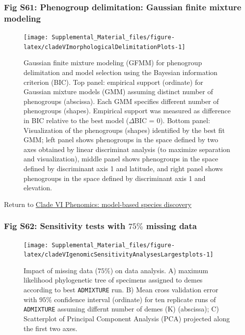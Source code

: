 \documentclass[
  11pt,
]{article}
\begin{document}
\hypertarget{fig-s61-phenogroup-delimitation-gaussian-finite-mixture-modeling}{%
\subsubsection{Fig S61: Phenogroup delimitation: Gaussian finite mixture modeling}\label{fig-s61-phenogroup-delimitation-gaussian-finite-mixture-modeling}}

\begin{figure}
\texttt{[image: Supplemental\_Material\_files/figure-latex/cladeVImorphologicalDelimitationPlots-1]} \caption{Gaussian finite mixture modeling (GFMM) for phenogroup delimitation and model selection using the Bayesian information criterion (BIC). Top panel: empirical support (ordinate) for Gaussian mixture models (GMM) assuming distinct number of phenogroups (abscissa). Each GMM specifies different number of phenogroups (shapes). Empirical support was measured as difference in BIC relative to the best model ($\Delta$BIC = $0$). Bottom panel: Visualization of the phenogroups (shapes) identified by the best fit GMM; left panel shows phenogroups in the space defined by two axes obtained by linear discriminat analysis (to maximize separation and visualization), middle panel shows phenogroups in the space defined by discriminant axis 1 and latitude, and right panel shows phenogroups in the space defined by discriminant axis 1 and elevation.}\label{fig:cladeVImorphologicalDelimitationPlots}
\end{figure}

Return to \protect\hyperlink{model-based-species-discovery-10}{Clade VI Phenomics: model-based species discovery}
\pagebreak

\hypertarget{fig-s62-sensitivity-tests-with-75-missing-data}{%
\subsubsection{\texorpdfstring{Fig S62: Sensitivity tests with \(75\%\) missing data}{Fig S62: Sensitivity tests with 75\textbackslash\% missing data}}\label{fig-s62-sensitivity-tests-with-75-missing-data}}

\begin{figure}
\texttt{[image: Supplemental\_Material\_files/figure-latex/cladeVIgenomicSensitivityAnalysesLargestplots-1]} \caption{Impact of missing data ($75\%$) on data analysis. A) maximum likelihood phylogenetic tree of specimens assigned to demes according to best \texttt{ADMIXTURE} run. B) Mean cross validation error with $95\%$ confidence interval (ordinate) for ten replicate runs of \texttt{ADMIXTURE} assuming differnt number of demes (K) (abscissa); C) Scatterplot of Principal Component Analysis (PCA) projected along the first two axes.}\label{fig:cladeVIgenomicSensitivityAnalysesLargestplots}
\end{figure}
\end{document}
